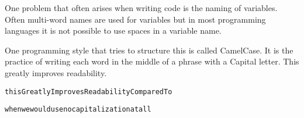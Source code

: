 
One problem that often arises when writing code is the naming of
variables. Often multi-word names are used for variables but in most
programming languages it is not possible to use spaces in a variable
name.

One programming style that tries to structure this is called
CamelCase. It is the practice of writing each word in the middle of a
phrase with a Capital letter. This greatly improves readability.

\hfill{\tt thisGreatlyImprovesReadabilityComparedTo}

\hfill{\tt whenwewouldusenocapitalizationatall}

